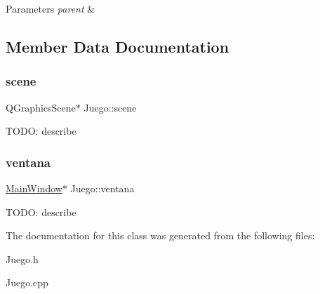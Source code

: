 \begin{DoxyParams}{Parameters}
{\em parent} & \\
\hline
\end{DoxyParams}


\subsection{Member Data Documentation}
\mbox{\label{classJuego_a914c8c3c8b1f40c4f2c13432939659d6}} 
\subsubsection{\texorpdfstring{scene}{scene}}
{\footnotesize\ttfamily Q\+Graphics\+Scene$\ast$ Juego\+::scene}

T\+O\+DO\+: describe \mbox{\label{classJuego_a02e77cacdf1aca8fc57f4e372bef1481}} 
\subsubsection{\texorpdfstring{ventana}{ventana}}
{\footnotesize\ttfamily \hyperlink{classMainWindow}{Main\+Window}$\ast$ Juego\+::ventana}

T\+O\+DO\+: describe 

The documentation for this class was generated from the following files\+:\begin{DoxyCompactItemize}
\item 
Juego.\+h\item 
Juego.\+cpp\end{DoxyCompactItemize}
